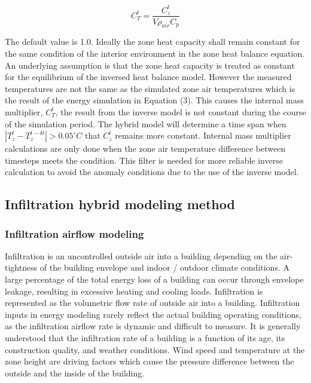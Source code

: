 \begin{equation}
C_T^t = \frac{C_z^t} {V\rho_{air} C_p}
\end{equation}

The default value is 1.0. Ideally the zone heat capacity shall remain constant for the same condition of the interior environment in the zone heat balance equation. An underlying assumption is that the zone heat capacity is treated as constant for the equilibrium of the inversed heat balance model. However the measured temperatures are not the same as the simulated zone air temperatures which is the result of the energy simulation in Equation (3). This causes the internal mass multiplier, $C_T^t$, the result from the inverse model is not constant during the course of the simulation period. The hybrid model will determine a time span when $|T_z^t - T_z^{t-\delta t}| > 0.05^{\circ}C$ that $C_z^t$ remains more constant. Internal mass multiplier calculations are only done when the zone air temperature difference between timesteps meets the condition. This filter is needed for more reliable inverse calculation to avoid the anomaly conditions due to the use of the inverse model.  

\subsection{Infiltration hybrid modeling method}\label{Infiltration hybrid modeling method}

\subsubsection{Infiltration airflow modeling}\label{Infiltration airflow modeling}

Infiltration is an uncontrolled outside air into a building depending on the air-tightness of the building envelope and indoor / outdoor climate conditions. A large percentage of the total energy loss of a building can occur through envelope leakage, resulting in excessive heating and cooling loads. Infiltration is represented as the volumetric flow rate of outside air into a building. Infiltration inputs in energy modeling rarely reflect the actual building operating conditions, as the infiltration airflow rate is dynamic and difficult to measure. It is generally understood that the infiltration rate of a building is a function of its age, its construction quality, and weather conditions. Wind speed and temperature at the zone height are driving factors which cause the pressure difference between the outside and the inside of the building.

